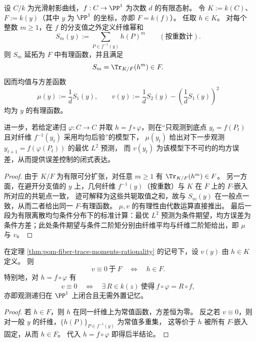 \begin{theorem}[纤维迹矩的有理性与均方最优预测的闭式表达]\label{thm:pom-fiber-trace-moments-rationality}
设 \(C/k\) 为光滑射影曲线，\(f:C\to\PP^1\) 为次数 \(d\) 的有限态射。
令 \(K:=k(C)\)、\(F:=k(y)\)（其中 \(y\) 为 \(\PP^1\) 的坐标，亦即 \(F=k(f)\)）。
任取 \(h\in K\)。
对每个整数 \(m\ge 1\)，在 \(f\) 的分支值之外定义纤维幂和
\[
S_m(y):=\sum_{P\in f^{-1}(y)} h(P)^m\qquad(\text{按重数计}).
\]
则 \(S_m\) 延拓为 \(F\) 中有理函数，并且满足
\[
S_m=\Tr_{K/F}(h^m)\in F.
\]
因而均值与方差函数
\[
\mu(y):=\frac{1}{d}S_1(y),\qquad
v(y):=\frac{1}{d}S_2(y)-\left(\frac{1}{d}S_1(y)\right)^{\!2}
\]
均为 \(y\) 的有理函数。
\par
进一步，若给定递归 \(\varphi:C\to C\) 并取 \(h=f\circ\varphi\)，则在“只观测到底点 \(y_t=f(P_t)\) 且对纤维 \(f^{-1}(y_t)\) 采用均匀后验”的模型下，
\(\mu(y_t)\) 给出对下一步观测 \(y_{t+1}=f(\varphi(P_t))\) 的最优 \(L^2\) 预测，
而 \(v(y_t)\) 为该模型下不可约的均方误差，从而提供误差控制的闭式表达。
\end{theorem}
\begin{proof}
由于 \(K/F\) 为有限可分扩张，对任意 \(m\ge 1\) 有 \(\Tr_{K/F}(h^m)\in F\)。
另一方面，在避开分支值的 \(y\) 上，几何纤维 \(f^{-1}(y)\)（按重数）与 \(K\) 在 \(\overline F\) 上的 \(F\)-嵌入所对应的共轭点一致，
迹可解释为这些共轭取值之和，故与 \(S_m(y)\) 在一般点一致，从而二者给出同一 \(F\)-有理函数。
\(\mu,v\) 的有理性由代数运算直接推出。
最后一段为有限离散均匀条件分布下的标准计算：最优 \(L^2\) 预测为条件期望，均方误差为条件方差；此处条件期望与条件二阶矩分别由纤维平均与纤维二阶矩给出，即 \(\mu\) 与 \(v\)。
\end{proof}

\begin{proposition}[零方差判别与模闭合的等价]\label{prop:pom-zero-variance-iff-closure}
在定理 \ref{thm:pom-fiber-trace-moments-rationality} 的记号下，设 \(v(y)\) 由 \(h\in K\) 定义。
则
\[
v\equiv 0\ \text{于}\ F
\quad\Longleftrightarrow\quad
h\in F.
\]
特别地，对 \(h=f\circ\varphi\) 有
\[
v\equiv 0
\quad\Longleftrightarrow\quad
\exists\,R\in k(z)\ \text{使得}\ f\circ\varphi=R\circ f,
\]
亦即观测递归在 \(\PP^1\) 上闭合且无需外置记忆。
\end{proposition}
\begin{proof}
若 \(h\in F\)，则 \(h\) 在同一纤维上为常值函数，方差恒为零。
反之若 \(v\equiv 0\)，则对一般 \(y\) 的纤维，\(\{h(P)\}_{P\in f^{-1}(y)}\) 为常值多重集，
这等价于 \(h\) 被所有 \(F\)-嵌入固定，从而 \(h\in F\)。
代入 \(h=f\circ\varphi\) 即得后半结论。
\end{proof}

